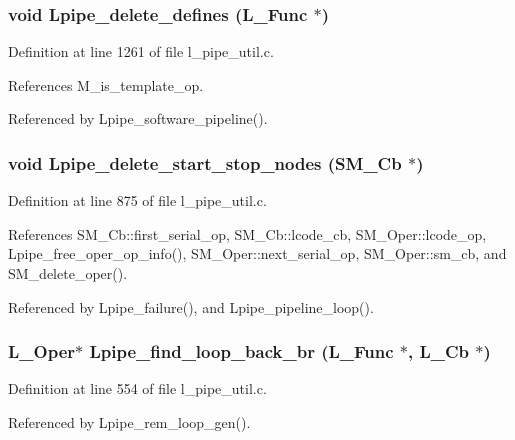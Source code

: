 \subsubsection{\setlength{\rightskip}{0pt plus 5cm}void Lpipe\_\-delete\_\-defines (L\_\-Func $\ast$)}\label{l__pipe__util_8h_09d06183dc0f6729b321b7e2c3c60699}




Definition at line 1261 of file l\_\-pipe\_\-util.c.

References M\_\-is\_\-template\_\-op.

Referenced by Lpipe\_\-software\_\-pipeline().
\subsubsection{\setlength{\rightskip}{0pt plus 5cm}void Lpipe\_\-delete\_\-start\_\-stop\_\-nodes (\bf{SM\_\-Cb} $\ast$)}\label{l__pipe__util_8h_2d5b9cca606c59bc37fc608efa6284c2}




Definition at line 875 of file l\_\-pipe\_\-util.c.

References SM\_\-Cb::first\_\-serial\_\-op, SM\_\-Cb::lcode\_\-cb, SM\_\-Oper::lcode\_\-op, Lpipe\_\-free\_\-oper\_\-op\_\-info(), SM\_\-Oper::next\_\-serial\_\-op, SM\_\-Oper::sm\_\-cb, and SM\_\-delete\_\-oper().

Referenced by Lpipe\_\-failure(), and Lpipe\_\-pipeline\_\-loop().
\subsubsection{\setlength{\rightskip}{0pt plus 5cm}L\_\-Oper$\ast$ Lpipe\_\-find\_\-loop\_\-back\_\-br (L\_\-Func $\ast$, L\_\-Cb $\ast$)}\label{l__pipe__util_8h_205159e237371c2666b10787e5ecdb95}




Definition at line 554 of file l\_\-pipe\_\-util.c.

Referenced by Lpipe\_\-rem\_\-loop\_\-gen().
